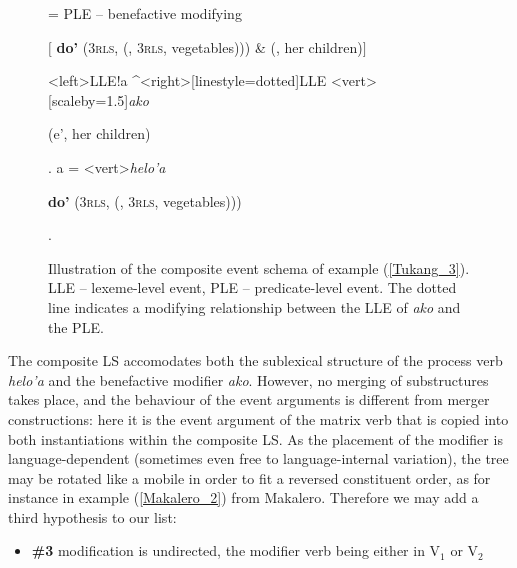 \begin{figure}


\jtree[xunit=9.5em,yunit=2em]
\! = {PLE -- benefactive modifying}{\begin{scriptsize} $[$ \textbf{do'} (3\textsc{rls}, \textbf{} (, 3\textsc{rls}, vegetables))) \& (, her children)$]$\end{scriptsize}}
<left>{LLE}!a ^<right>[linestyle=dotted]{LLE}
<vert>[scaleby=1.5]{\textit{ako}}{\begin{scriptsize}  (e', her children)\end{scriptsize}}.
\!a = <vert>{\textit{helo'a}}
{\begin{scriptsize} \textbf{do'} (3\textsc{rls}, \textbf{} (, 3\textsc{rls}, vegetables)))\end{scriptsize}}.
\endjtree


\caption[Event schema illustration of example (\ref{Tukang_3})]{Illustration of the composite event schema of example (\ref{Tukang_3}). LLE -- lexeme-level event, PLE -- predicate-level event. The dotted line indicates a modifying relationship between the LLE of \textit{ako} and the PLE.}
\label{figure:eventschema_Maybrat97}
\end{figure}


The composite LS accomodates both the sublexical structure of the process verb \textit{helo'a} and the benefactive modifier \textit{ako}. However, no merging of substructures takes place, and the behaviour of the event arguments is different from merger constructions: here it is the event argument of the matrix verb that is copied into both instantiations within the composite LS. As the placement of the modifier is language-dependent (sometimes even free to language-internal variation), the tree may be rotated like a mobile in order to fit a reversed constituent order, as for instance in example (\ref{Makalero_2}) from Makalero. Therefore we may add a third hypothesis to our list:

\begin{itemize}
\item \textbf{\#3} modification is undirected, the modifier verb being either in V$_1$ or V$_2$
\end{itemize}

